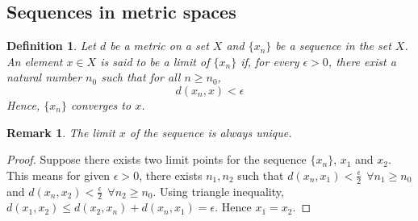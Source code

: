 \documentclass[12pt]{report}
\newtheorem{defn}{Definition}
\newtheorem*{rem}{Remark}
\begin{document}
\subsection*{Sequences in metric spaces}
\begin{defn}
    Let $d$ be a metric on a set $X$ and $\{x_n\}$ be a sequence in the set $X$. An element $x \in X$ is said to be a limit of $\{x_n\}$ if, for every $\epsilon > 0$, there exist a natural number $n_0$ such that for all $n \geq n_0$,
    $$ d(x_n, x) < \epsilon$$
    Hence, $\{x_n\}$ converges to $x$.
\end{defn}
\begin{rem}
    The limit $x$ of the sequence is always unique.
\end{rem}
\begin{proof}
    Suppose there exists two limit points for the sequence $\{x_n\}$, $x_1$ and $x_2$. This means for given $\epsilon > 0$, there exists $n_1,n_2$ such that $d(x_n , x_1) < \frac{\epsilon}{2}~~\forall n_1 \geq n_0$ and $d(x_n , x_2) < \frac{\epsilon}{2}~~\forall n_2 \geq n_0$. Using triangle inequality, $d(x_1, x_2) \leq d(x_2,x_n) + d(x_n, x_1) = \epsilon$. Hence $x_1 = x_2$.
\end{proof}
\end{document}
